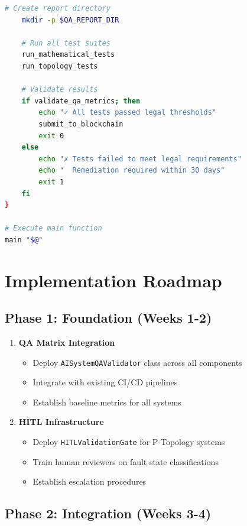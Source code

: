 \documentclass[12pt,a4paper]{article}
\begin{document}
\begin{lstlisting}[language=bash, caption=Automated Regression Test Suite]
    # Create report directory
    mkdir -p $QA_REPORT_DIR
    
    # Run all test suites
    run_mathematical_tests
    run_topology_tests
    
    # Validate results
    if validate_qa_metrics; then
        echo "✓ All tests passed legal thresholds"
        submit_to_blockchain
        exit 0
    else
        echo "✗ Tests failed to meet legal requirements"
        echo "  Remediation required within 30 days"
        exit 1
    fi
}

# Execute main function
main "$@"
\end{lstlisting}

\section{Implementation Roadmap}

\subsection{Phase 1: Foundation (Weeks 1-2)}

\begin{enumerate}
    \item \textbf{QA Matrix Integration}
    \begin{itemize}
        \item Deploy \texttt{AISystemQAValidator} class across all components
        \item Integrate with existing CI/CD pipelines
        \item Establish baseline metrics for all systems
    \end{itemize}
    
    \item \textbf{HITL Infrastructure}
    \begin{itemize}
        \item Deploy \texttt{HITLValidationGate} for P-Topology systems
        \item Train human reviewers on fault state classifications
        \item Establish escalation procedures
    \end{itemize}
\end{enumerate}

\subsection{Phase 2: Integration (Weeks 3-4)}
\end{document}
